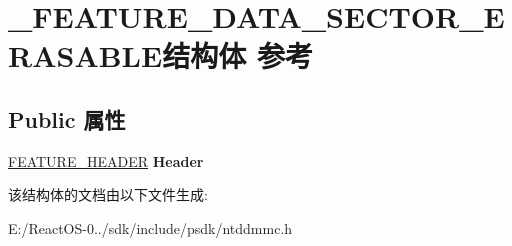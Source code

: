 \hypertarget{struct___f_e_a_t_u_r_e___d_a_t_a___s_e_c_t_o_r___e_r_a_s_a_b_l_e}{}\section{\+\_\+\+F\+E\+A\+T\+U\+R\+E\+\_\+\+D\+A\+T\+A\+\_\+\+S\+E\+C\+T\+O\+R\+\_\+\+E\+R\+A\+S\+A\+B\+L\+E结构体 参考}
\label{struct___f_e_a_t_u_r_e___d_a_t_a___s_e_c_t_o_r___e_r_a_s_a_b_l_e}
\subsection*{Public 属性}
\begin{DoxyCompactItemize}
\item 
\mbox{\label{struct___f_e_a_t_u_r_e___d_a_t_a___s_e_c_t_o_r___e_r_a_s_a_b_l_e_ac4b5c805ad0cde15cbac4577961276b1}} 
\hyperlink{struct___f_e_a_t_u_r_e___h_e_a_d_e_r}{F\+E\+A\+T\+U\+R\+E\+\_\+\+H\+E\+A\+D\+ER} {\bfseries Header}
\end{DoxyCompactItemize}


该结构体的文档由以下文件生成\+:\begin{DoxyCompactItemize}
\item 
E\+:/\+React\+O\+S-\/0../sdk/include/psdk/ntddmmc.\+h\end{DoxyCompactItemize}

